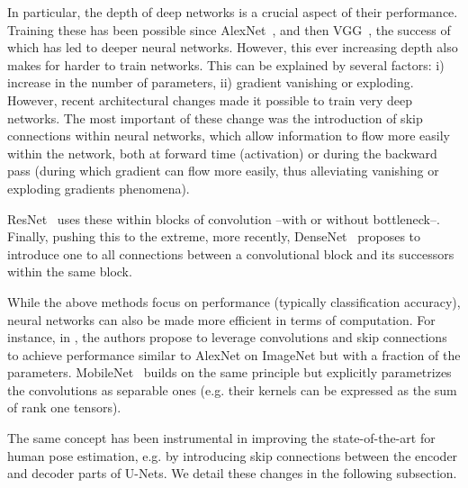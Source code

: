 \documentclass[a4paper, 10pt, conference]{ieeeconf}      \usepackage{FG2020}
\begin{document}
In particular, the depth of deep networks is a crucial aspect of their performance. Training these has been possible since AlexNet~\cite{krizhevsky2012imagenet}, and then VGG~\cite{simonyan2014very}, the success of which has led to deeper neural networks.
However, this ever increasing depth also makes for harder to train networks.
This can be explained by several factors: i) increase in the number of parameters, ii) gradient vanishing or exploding.
However, recent architectural changes made it possible to train very deep networks.
The most important of these change was the introduction of skip connections within neural networks, which allow information to flow more easily within the network, both at forward time (activation) or during the backward pass (during which gradient can flow more easily, thus alleviating vanishing or exploding gradients phenomena).

ResNet~\cite{he2016deep} uses these within blocks of convolution --with or without bottleneck--. 
Finally, pushing this to the extreme, more recently, DenseNet~\cite{huang2016densely} proposes to introduce one to all connections  between a convolutional block and its successors within the same block.

While the above methods focus on performance (typically classification accuracy), neural networks can also be made more efficient in terms of computation. For instance, in \cite{iandola2016squeezenet}, the authors propose to leverage  convolutions and skip connections to achieve performance similar to AlexNet on ImageNet but with a fraction of the parameters. MobileNet~\cite{howard2017mobilenets} builds on the same principle but explicitly parametrizes the convolutions as separable ones (e.g. their kernels can be expressed as the sum of rank one tensors).

The same concept has been instrumental in improving the state-of-the-art for human pose estimation, e.g. by introducing skip connections between the encoder and decoder parts of U-Nets. We detail these changes in the following subsection.
\end{document}
